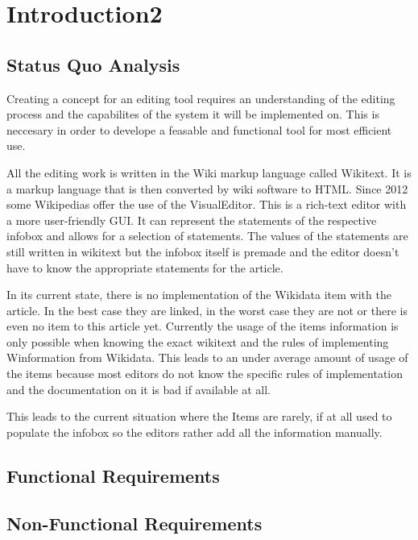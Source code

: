 \chapter{Introduction2}

\section{Status Quo Analysis}

Creating a concept for an editing tool requires an understanding of the editing process and the capabilites of the system it will be implemented on. This is neccesary in order to develope a feasable and functional tool for most efficient use. 

All the editing work is written in the Wiki markup language called Wikitext. It is a markup language that is then converted by wiki software to HTML. Since 2012 some Wikipedias offer the use of the VisualEditor. This is a rich-text editor with a more user-friendly GUI. It can represent the statements of the respective infobox and allows for a selection of statements. The values of the statements are still written in wikitext but the infobox itself is premade and the editor doesn't have to know the appropriate statements for the article. 

In its current state, there is no implementation of the Wikidata item with the article. In the best case they are linked, in the worst case they are not or there is even no item to this article yet. Currently the usage of the items information is only possible when knowing the exact wikitext and the rules of implementing Winformation from Wikidata. This leads to an under average amount of usage of the items because most editors do not know the specific rules of implementation and the documentation on it is bad if available at all. 

This leads to the current situation where the Items are rarely, if at all used to populate the infobox so the editors rather add all the information manually.

\clearpage
\section{Functional Requirements}

\section{Non-Functional Requirements}

